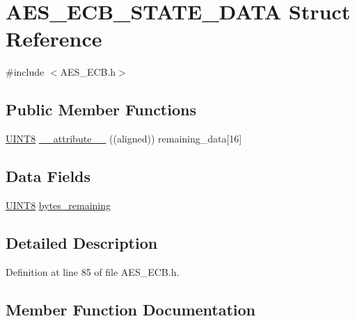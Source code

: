 \hypertarget{struct_a_e_s___e_c_b___s_t_a_t_e___d_a_t_a}{}\section{A\+E\+S\+\_\+\+E\+C\+B\+\_\+\+S\+T\+A\+T\+E\+\_\+\+D\+A\+T\+A Struct Reference}
\label{struct_a_e_s___e_c_b___s_t_a_t_e___d_a_t_a}


{\ttfamily \#include $<$A\+E\+S\+\_\+\+E\+C\+B.\+h$>$}

\subsection*{Public Member Functions}
\begin{DoxyCompactItemize}
\item 
\hyperlink{_generic_type_defs_8h_ab27e9918b538ce9d8ca692479b375b6a}{U\+I\+N\+T8} \hyperlink{struct_a_e_s___e_c_b___s_t_a_t_e___d_a_t_a_a31c384049837ef4e6d897e530589a2d6}{\+\_\+\+\_\+attribute\+\_\+\+\_\+} ((aligned)) remaining\+\_\+data\mbox{[}16\mbox{]}
\end{DoxyCompactItemize}
\subsection*{Data Fields}
\begin{DoxyCompactItemize}
\item 
\hyperlink{_generic_type_defs_8h_ab27e9918b538ce9d8ca692479b375b6a}{U\+I\+N\+T8} \hyperlink{struct_a_e_s___e_c_b___s_t_a_t_e___d_a_t_a_a32274d89fb92f1c74886d795bd7ba31c}{bytes\+\_\+remaining}
\end{DoxyCompactItemize}


\subsection{Detailed Description}


Definition at line 85 of file A\+E\+S\+\_\+\+E\+C\+B.\+h.



\subsection{Member Function Documentation}
\hypertarget{struct_a_e_s___e_c_b___s_t_a_t_e___d_a_t_a_a31c384049837ef4e6d897e530589a2d6}{}
